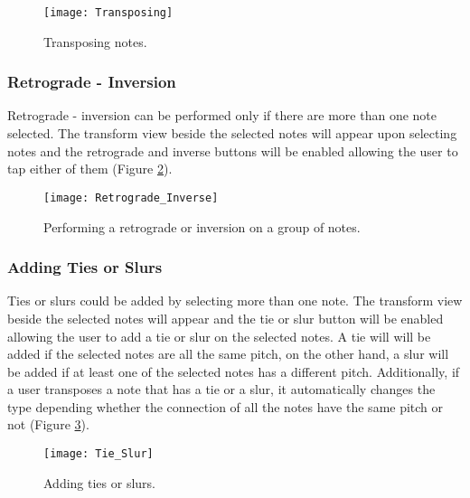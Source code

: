 \begin{figure}[H]
	\centering
	\texttt{[image: Transposing]}
    \caption{Transposing notes.}
    \label{fig:transposing}
\end{figure}

\subsubsection{Retrograde - Inversion}
Retrograde - inversion can be performed only if there are more than one note selected. The transform view beside the selected notes will appear upon selecting notes and the retrograde and inverse buttons will be enabled allowing the user to tap either of them (Figure \ref{fig:r-i}).

\begin{figure}[H]
	\centering
	\texttt{[image: Retrograde\_Inverse]}
    \caption{Performing a retrograde or inversion on a group of notes.}
    \label{fig:r-i}
\end{figure}

\subsubsection{Adding Ties or Slurs}
Ties or slurs could be added by selecting more than one note. The transform view beside the selected notes will appear and the tie or slur button will be enabled allowing the user to add a tie or slur on the selected notes. A tie will will be added if the selected notes are all the same pitch, on the other hand, a slur will be added if at least one of the selected notes has a different pitch. Additionally, if a user transposes a note that has a tie or a slur, it automatically changes the type depending whether the connection of all the notes have the same pitch or not (Figure \ref{fig:ties-slur}).

\begin{figure}[H]
	\centering
	\texttt{[image: Tie\_Slur]}
    \caption{Adding ties or slurs.}
    \label{fig:ties-slur}
\end{figure}

